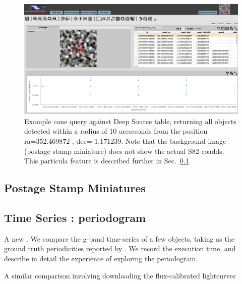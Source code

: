 \documentclass[fleqn,usenatbib]{mnras} %
\begin{document}
\begin{figure}
\includegraphics[width=\textwidth]{figs/3_PDAC_cone_DeepSource}
\caption{Example cone query against Deep Source table, returning all objects detected within a radius of 10 arcseconds from the position ra=352.469872 , dec=-1.171239. Note that the background image (postage stamp miniature) does not show the actual S82 coadds. This particula feature is described further in Sec.~\ref{sec:miniatures}}
\label{fig:PDAC_cone_DS}
\end{figure}


\subsection{Postage Stamp Miniatures }
\label{sec:miniatures}


\subsection{Time Series : periodogram}
\label{sec:periodogram}

A new . We compare the g-band time-series of a few objects, taking as the ground truth periodicities reported by \cite{sesar2010}. We record the execution time, and describe in detail the experience of exploring the periodogram.   

A similar comparison involving downloading the flux-calibrated lightcurves 

\end{document}
